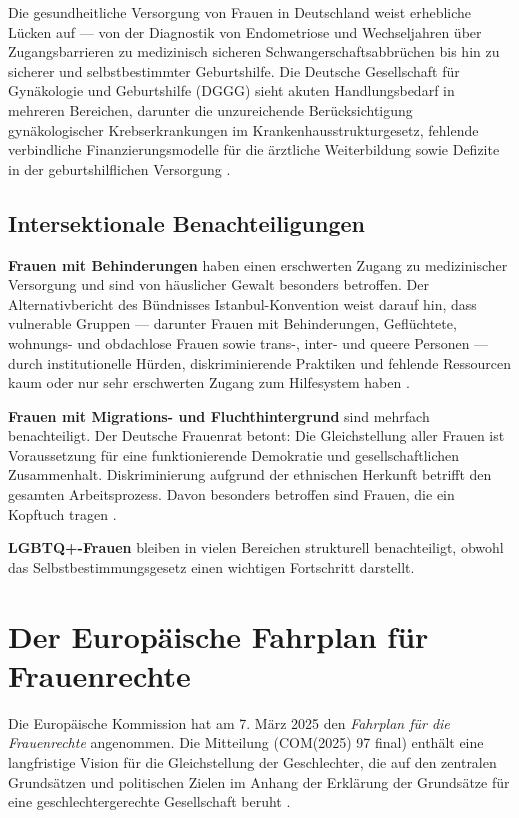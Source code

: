 \documentclass[12pt,a4paper]{article}
\begin{document}
	Die gesundheitliche Versorgung von Frauen in Deutschland weist erhebliche Lücken auf — von der Diagnostik von Endometriose und Wechseljahren über Zugangsbarrieren zu medizinisch sicheren Schwangerschaftsabbrüchen bis hin zu sicherer und selbstbestimmter Geburtshilfe. Die Deutsche Gesellschaft für Gynäkologie und Geburtshilfe (DGGG) sieht akuten Handlungsbedarf in mehreren Bereichen, darunter die unzureichende Berücksichtigung gynäkologischer Krebserkrankungen im Krankenhausstrukturgesetz, fehlende verbindliche Finanzierungsmodelle für die ärztliche Weiterbildung sowie Defizite in der geburtshilflichen Versorgung \cite{dggg_appell}.
	
	\subsection{Intersektionale Benachteiligungen}
	
	\textbf{Frauen mit Behinderungen} haben einen erschwerten Zugang zu medizinischer Versorgung und sind von häuslicher Gewalt besonders betroffen. Der Alternativbericht des Bündnisses Istanbul-Konvention weist darauf hin, dass vulnerable Gruppen — darunter Frauen mit Behinderungen, Geflüchtete, wohnungs- und obdachlose Frauen sowie trans-, inter- und queere Personen — durch institutionelle Hürden, diskriminierende Praktiken und fehlende Ressourcen kaum oder nur sehr erschwerten Zugang zum Hilfesystem haben \cite{bik_alternativbericht}.
	
	\textbf{Frauen mit Migrations- und Fluchthintergrund} sind mehrfach benachteiligt. Der Deutsche Frauenrat betont: Die Gleichstellung aller Frauen ist Voraussetzung für eine funktionierende Demokratie und gesellschaftlichen Zusammenhalt. Diskriminierung aufgrund der ethnischen Herkunft betrifft den gesamten Arbeitsprozess. Davon besonders betroffen sind Frauen, die ein Kopftuch tragen \cite{bmas_diskriminierung}.
	
	\textbf{LGBTQ+-Frauen} bleiben in vielen Bereichen strukturell benachteiligt, obwohl das Selbstbestimmungsgesetz einen wichtigen Fortschritt darstellt.
	
	\section{Der Europäische Fahrplan für Frauenrechte}
	
	Die Europäische Kommission hat am 7. März 2025 den \textit{Fahrplan für die Frauenrechte} angenommen. Die Mitteilung (COM(2025) 97 final) enthält eine langfristige Vision für die Gleichstellung der Geschlechter, die auf den zentralen Grundsätzen und politischen Zielen im Anhang der Erklärung der Grundsätze für eine geschlechtergerechte Gesellschaft beruht \cite{eu_fahrplan}.
	
\end{document}
